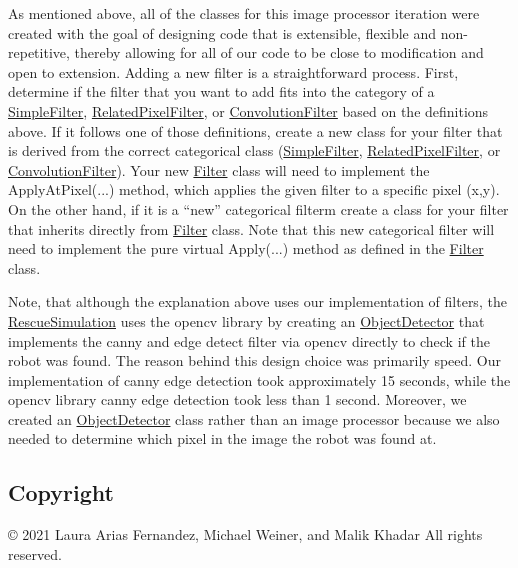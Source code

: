 As mentioned above, all of the classes for this image processor iteration were created with the goal of designing code that is extensible, flexible and non-\/repetitive, thereby allowing for all of our code to be close to modification and open to extension. Adding a new filter is a straightforward process. First, determine if the filter that you want to add fits into the category of a \hyperlink{classSimpleFilter}{Simple\+Filter}, \hyperlink{classRelatedPixelFilter}{Related\+Pixel\+Filter}, or \hyperlink{classConvolutionFilter}{Convolution\+Filter} based on the definitions above. If it follows one of those definitions, create a new class for your filter that is derived from the correct categorical class (\hyperlink{classSimpleFilter}{Simple\+Filter}, \hyperlink{classRelatedPixelFilter}{Related\+Pixel\+Filter}, or \hyperlink{classConvolutionFilter}{Convolution\+Filter}). Your new \hyperlink{classFilter}{Filter} class will need to implement the {\ttfamily Apply\+At\+Pixel(...)} method, which applies the given filter to a specific pixel (x,y). On the other hand, if it is a “new” categorical filterm create a class for your filter that inherits directly from \hyperlink{classFilter}{Filter} class. Note that this new categorical filter will need to implement the pure virtual {\ttfamily Apply(...)} method as defined in the \hyperlink{classFilter}{Filter} class.

Note, that although the explanation above uses our implementation of filters, the \hyperlink{classRescueSimulation}{Rescue\+Simulation} uses the {\ttfamily opencv} library by creating an \hyperlink{classObjectDetector}{Object\+Detector} that implements the canny and edge detect filter via {\ttfamily opencv} directly to check if the robot was found. The reason behind this design choice was primarily speed. Our implementation of canny edge detection took approximately 15 seconds, while the {\ttfamily opencv} library canny edge detection took less than 1 second. Moreover, we created an \hyperlink{classObjectDetector}{Object\+Detector} class rather than an image processor because we also needed to determine which pixel in the image the robot was found at.

\subsection*{Copyright}

\copyright{} 2021 Laura Arias Fernandez, Michael Weiner, and Malik Khadar All rights reserved. 